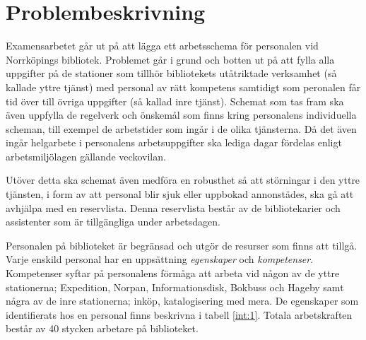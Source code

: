 


\section{Problembeskrivning}
Examensarbetet går ut på att lägga ett arbetsschema för personalen vid Norrköpings bibliotek. Problemet går i grund och botten ut på att fylla alla uppgifter på de stationer som tillhör bibliotekets utåtriktade verksamhet (så kallade yttre tjänst) med personal av rätt kompetens samtidigt som peronalen får tid över till övriga uppgifter (så kallad inre tjänst). Schemat som tas fram ska även uppfylla de regelverk och önskemål som finns kring personalens individuella scheman, till exempel de arbetstider som ingår i de olika tjänsterna. Då det även ingår helgarbete i personalens arbetsuppgifter ska lediga dagar fördelas enligt arbetsmiljölagen gällande veckovilan.

Utöver detta ska schemat även medföra en robusthet så att störningar i den yttre tjänsten, i form av att personal blir sjuk eller uppbokad annonstädes, ska gå att avhjälpa med en reservlista. Denna reservlista består av de bibliotekarier och assistenter som är tillgängliga under arbetsdagen. 

Personalen på biblioteket är begränsad och utgör de resurser som finns att tillgå. Varje enskild personal har en uppsättning \textit{egenskaper} och \textit{kompetenser}. Kompetenser syftar på personalens förmåga att arbeta vid någon av de yttre stationerna; Expedition, Norpan, Informationsdisk, Bokbuss och Hageby samt några av de inre stationerna; inköp, katalogisering med mera. De egenskaper som identifierats hos en personal finns beskrivna i tabell \ref{int:1}. Totala arbetskraften består av 40 stycken arbetare på biblioteket.

